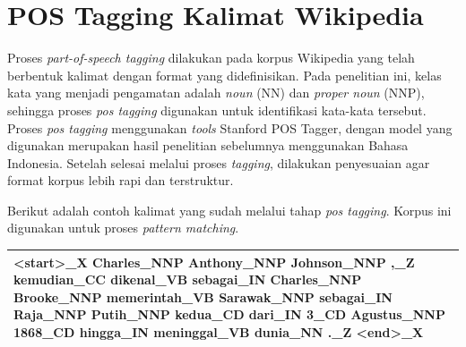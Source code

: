 \section{POS Tagging Kalimat Wikipedia}
Proses \textit{part-of-speech tagging} dilakukan pada korpus Wikipedia yang telah berbentuk kalimat dengan format yang didefinisikan. Pada penelitian ini, kelas kata yang menjadi pengamatan adalah \textit{noun} (NN) dan \textit{proper noun} (NNP), sehingga proses \textit{pos tagging} digunakan untuk identifikasi kata-kata tersebut. Proses \textit{pos tagging} menggunakan \textit{tools} Stanford POS Tagger, dengan model yang digunakan merupakan hasil penelitian sebelumnya menggunakan Bahasa Indonesia.  Setelah selesai melalui proses \textit{tagging}, dilakukan penyesuaian agar format korpus lebih rapi dan terstruktur. 

Berikut adalah contoh kalimat yang sudah melalui tahap \textit{pos tagging}. Korpus ini digunakan untuk proses \textit{pattern matching}.
\begin{center}
\begin{tabular}{ | m{32em} | } 
\hline
<start>\_X Charles\_NNP Anthony\_NNP Johnson\_NNP ,\_Z kemudian\_CC dikenal\_VB sebagai\_IN Charles\_NNP Brooke\_NNP memerintah\_VB Sarawak\_NNP sebagai\_IN Raja\_NNP Putih\_NNP kedua\_CD dari\_IN 3\_CD Agustus\_NNP 1868\_CD hingga\_IN meninggal\_VB dunia\_NN .\_Z <end>\_X \\ 
\hline
\end{tabular}
\end{center}


